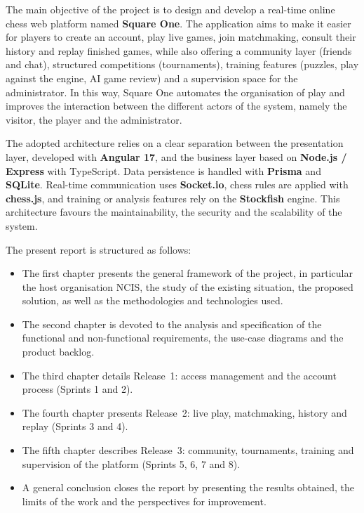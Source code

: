\documentclass[12pt,a4paper,oneside]{report}
\begin{document}
The main objective of the project is to design and develop a real-time online chess web platform named \textbf{Square One}. The application aims to make it easier for players to create an account, play live games, join matchmaking, consult their history and replay finished games, while also offering a community layer (friends and chat), structured competitions (tournaments), training features (puzzles, play against the engine, AI game review) and a supervision space for the administrator. In this way, Square One automates the organisation of play and improves the interaction between the different actors of the system, namely the visitor, the player and the administrator.

The adopted architecture relies on a clear separation between the presentation layer, developed with \textbf{Angular 17}, and the business layer based on \textbf{Node.js / Express} with TypeScript. Data persistence is handled with \textbf{Prisma} and \textbf{SQLite}. Real-time communication uses \textbf{Socket.io}, chess rules are applied with \textbf{chess.js}, and training or analysis features rely on the \textbf{Stockfish} engine. This architecture favours the maintainability, the security and the scalability of the system.

The present report is structured as follows:
\begin{itemize}[leftmargin=1.4em,itemsep=0.45em,topsep=0.6em]
  \item The first chapter presents the general framework of the project, in particular the host organisation NCIS, the study of the existing situation, the proposed solution, as well as the methodologies and technologies used.
  \item The second chapter is devoted to the analysis and specification of the functional and non-functional requirements, the use-case diagrams and the product backlog.
  \item The third chapter details Release~1: access management and the account process (Sprints 1 and 2).
  \item The fourth chapter presents Release~2: live play, matchmaking, history and replay (Sprints 3 and 4).
  \item The fifth chapter describes Release~3: community, tournaments, training and supervision of the platform (Sprints 5, 6, 7 and 8).
  \item A general conclusion closes the report by presenting the results obtained, the limits of the work and the perspectives for improvement.
\end{itemize}
\end{document}
